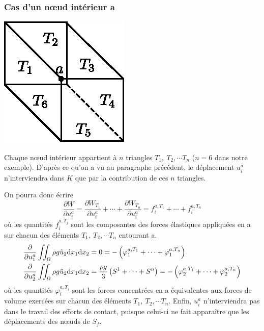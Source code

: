 \subsubsection{Cas d'un nœud intérieur a}
\begin{multicols}{2}
    \begin{center}
        \includegraphics{../images/T1_Ch09-12}
    \end{center}
    \columnbreak
Chaque nœud intérieur appartient à $n$ triangles $T_1,\ T_2, \cdots T_n$ ($n=6$ dans notre exemple).
D'après ce qu'on a vu au paragraphe précédent, le déplacement $u_i^ a$ n'interviendra dans $K$ que par la contribution de ces $n$ triangles.
\end{multicols}
On pourra donc écrire 
\begin{equation}
    \frac{\partial W}{\partial u_i^a} = \frac{\partial W_{T_1}}{\partial u_i^a} + \cdots + \frac{\partial W_{T_n}}{\partial u_i^a} = f_i^{a,T_1} + \cdots + f_i^{a, T_n}
    \label{eq:Ch09-087}
\end{equation}
où les quantités $f_i^{a,T_j}$ sont les composantes des forces élastiques appliquées en a sur chacun des éléments  $T_1,\ T_2, \cdots T_n$ entourant a.
\begin{equation}
    \begin{aligned}
        \frac{\partial }{\partial u_1^a} \iint_{\Omega} \rho g \tilde{u}_2 \mathrm{d} x_1 \mathrm{d} x_2 &= 0 = - \left( \varphi_1^{a,T_1} + \cdots + \varphi_1^{a,T_n} \right) \\
        \frac{\partial }{\partial u_2^a} \iint_{\Omega} \rho g \tilde{u}_2 \mathrm{d} x_1 \mathrm{d} x_2 &= \frac{\rho g}{3} \left( S^1 + \cdots + S^n \right) = - \left( \varphi_2^{a,T_1} + \cdots + \varphi_2^{a,T_n} \right)
    \end{aligned}
    \label{eq:Ch09-088}
\end{equation}
où les quantités $\varphi_i^{a,T_j}$ sont les forces concentrées en a équivalentes aux forces de volume exercées sur chacun des éléments $T_1,\ T_2, \cdots T_n$.
Enfin, $u_i^a$ n'interviendra pas dans le travail des efforts de contact, puisque celui-ci ne fait apparaître que les déplacements des nœuds de $S_f$.

